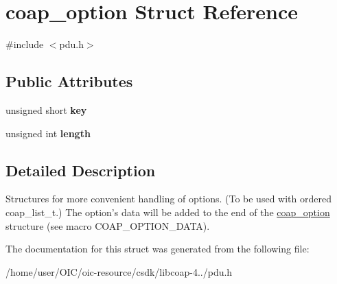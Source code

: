 \hypertarget{structcoap__option}{}\section{coap\+\_\+option Struct Reference}
\label{structcoap__option}


{\ttfamily \#include $<$pdu.\+h$>$}

\subsection*{Public Attributes}
\begin{DoxyCompactItemize}
\item 
\hypertarget{structcoap__option_a95d736f2ba90fce6a05e547cb93ea9e2}{}unsigned short {\bfseries key}\label{structcoap__option_a95d736f2ba90fce6a05e547cb93ea9e2}

\item 
\hypertarget{structcoap__option_a45785c6e5bd47b62e0b222a62d477f2a}{}unsigned int {\bfseries length}\label{structcoap__option_a45785c6e5bd47b62e0b222a62d477f2a}

\end{DoxyCompactItemize}


\subsection{Detailed Description}
Structures for more convenient handling of options. (To be used with ordered coap\+\_\+list\+\_\+t.) The option's data will be added to the end of the \hyperlink{structcoap__option}{coap\+\_\+option} structure (see macro C\+O\+A\+P\+\_\+\+O\+P\+T\+I\+O\+N\+\_\+\+D\+A\+T\+A). 

The documentation for this struct was generated from the following file\+:\begin{DoxyCompactItemize}
\item 
/home/user/\+O\+I\+C/oic-\/resource/csdk/libcoap-\/4../pdu.\+h\end{DoxyCompactItemize}
